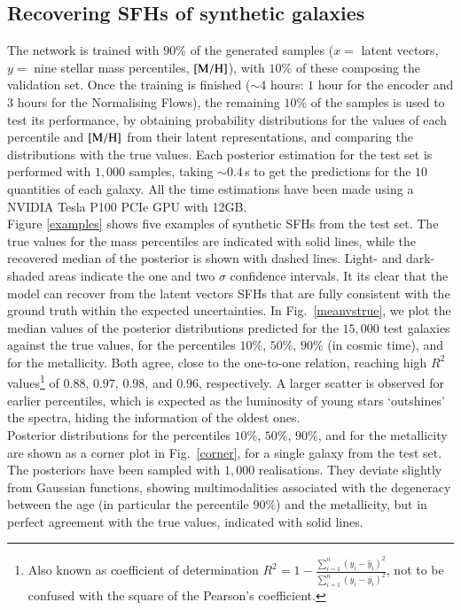 \subsection{Recovering SFHs of synthetic galaxies}
\label{post}
The network is trained with $90$\% of the generated samples ($x=$ {latent vectors}, $y=$ {nine stellar mass percentiles, $\rm{[M/H]}$}), with $10\%$ of these composing the validation set. Once the training is finished ($\sim4$ hours: $1$ hour for the encoder and $3$ hours for the Normalising Flows), the remaining $10$\% of the samples is used to test its performance, by obtaining probability distributions for the values of each percentile and $\rm{[M/H]}$ from their latent representations, and comparing the distributions with the true values. Each posterior estimation for the test set is performed with $1{,}000$ samples, taking $\sim0.4$\,s to get the predictions for the $10$ quantities of each galaxy. All the time estimations have been made using a NVIDIA Tesla P100 PCIe GPU with 12GB.\\



Figure \ref{examples} shows five examples of synthetic SFHs from the test set. The true values for the mass percentiles are indicated with  solid lines, while the recovered median of the posterior is shown with dashed lines. Light- and dark-shaded areas indicate the one and two $\sigma$ confidence intervals. It its clear that the model can recover from the latent vectors SFHs that are fully consistent with the ground truth within the expected uncertainties. In Fig.~\ref{meanvstrue}, we plot the median values of the posterior distributions predicted for the $15{,}000$ test galaxies against the true values, for the percentiles $10\%$, $50\%$, $90\%$ (in cosmic time), and for the metallicity. Both agree, close to the one-to-one relation, reaching high $R^{2}$ values\footnote{Also known as coefficient of determination $\displaystyle R^2=1-\frac{\sum_{i=1}^n\left(y_i-\widehat{y}_i\right)^2}{\sum_{i=1}^n\left(y_i-\overline{y_i}\right)^2}$, not to be confused with the square of the Pearson's coefficient.} of $0.88$, $0.97$, $0.98$, and $0.96$, respectively.  A larger scatter is observed for earlier percentiles, which is expected as the luminosity of young stars `outshines' the spectra, hiding the information of the oldest ones. \\

Posterior distributions for the percentiles $10\%$, $50\%$, $90\%$, and for the metallicity are shown as a corner plot in Fig.~\ref{corner}, for a single galaxy from the test set. The posteriors have been sampled with $1{,}000$ realisations. They deviate slightly from Gaussian functions, showing multimodalities associated with the degeneracy between the age (in particular the percentile $90\%$)  and  the metallicity, but in perfect agreement with the true values, indicated with solid lines.\\


